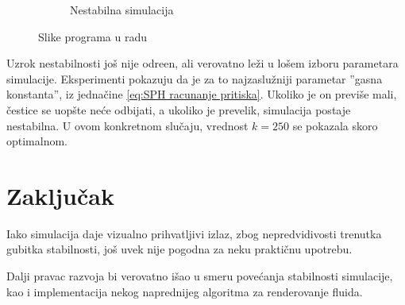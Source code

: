 \documentclass[12pt]{article}
\begin{document}
\begin{figure}[H]
\begin{subfigure}[b]{0.49\textwidth}
        \caption{Nestabilna simulacija}
        \label{fig:Stabilna simulacija}
    \end{subfigure}
    \caption{Slike programa u radu} \label{Slike}
    \end{figure}
    Uzrok nestabilnosti jo\v s nije odre\dj en, ali verovatno le\v zi u lo\v sem izboru parametara simulacije. Eksperimenti pokazuju da je za to najzaslu\v zniji parametar ''gasna konstanta'', iz jedna\v cine \eqref{eq:SPH racunanje pritiska}. Ukoliko je on previ\v se mali, \v cestice se uop\v ste ne\'ce odbijati, a ukoliko je prevelik, simulacija postaje nestabilna. U ovom konkretnom slu\v caju, vrednost $k=250$ se pokazala skoro optimalnom.
\section{Zaklju\v cak}
    Iako simulacija daje vizualno prihvatljivi izlaz, zbog nepredvidivosti trenutka gubitka stabilnosti, jo\v s uvek nije pogodna za neku prakti\v cnu upotrebu.

    Dalji pravac razvoja bi verovatno i\v sao u smeru pove\'canja stabilnosti simulacije, kao i implementacija nekog naprednijeg algoritma za renderovanje fluida.

\newpage


\end{document}
